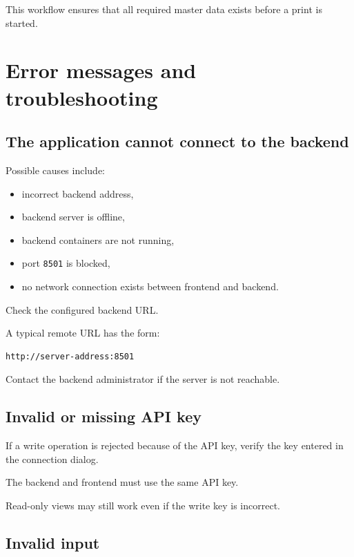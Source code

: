 \documentclass[a4paper,11pt]{article}
\begin{document}
This workflow ensures that all required master data exists before a print is
started.

\section{Error messages and troubleshooting}

\subsection{The application cannot connect to the backend}

Possible causes include:

\begin{itemize}
  \item incorrect backend address,
  \item backend server is offline,
  \item backend containers are not running,
  \item port \texttt{8501} is blocked,
  \item no network connection exists between frontend and backend.
\end{itemize}

Check the configured backend URL.

A typical remote URL has the form:

\begin{lstlisting}
http://server-address:8501
\end{lstlisting}

Contact the backend administrator if the server is not reachable.

\subsection{Invalid or missing API key}

If a write operation is rejected because of the API key, verify the key
entered in the connection dialog.

The backend and frontend must use the same API key.

Read-only views may still work even if the write key is incorrect.

\subsection{Invalid input}
\end{document}
